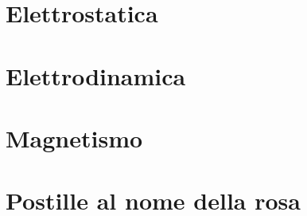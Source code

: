 \documentclass[a4paper, 11pt, twoside, openright, italian]{memoir}
\begin{document}
\frontmatter

%
%

\mainmatter
\part{Elettrostatica}





\part{Elettrodinamica}

\part{Magnetismo}

%
%
\part{Postille al nome della rosa}

%
%
%
%
%
%
\end{document}
